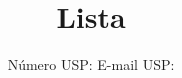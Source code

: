 \documentclass[twoside, fleqn]{article}
\title{Lista \esnumber}
\author{\studentname \qquad Número USP: \uspid \qquad E-mail USP: \uspmail}
\begin{document}
\maketitle
\tableofcontents
\listoffigures
\lstlistoflistings

\newpage

\newpage

\newpage

\newpage

\newpage

\newpage

\newpage

\newpage

\newpage

\newpage

\newpage

\newpage



\end{document}
